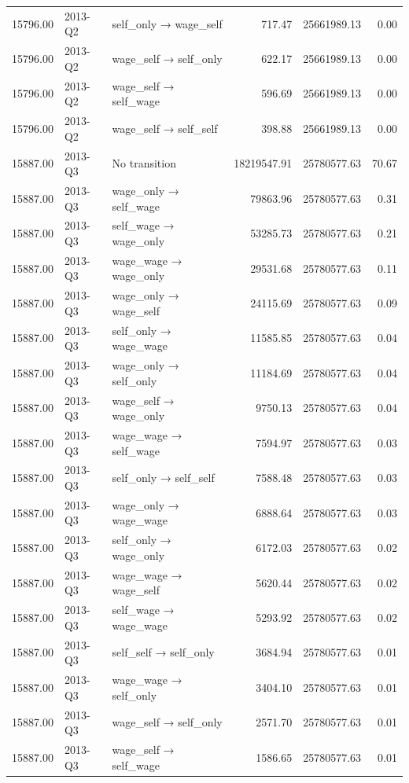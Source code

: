 \begin{table}[ht]
{\begin{tabular}{rllrrr}
  15796.00 & 2013-Q2 & self\_only → wage\_self & 717.47 & 25661989.13 & 0.00 \\ 
  15796.00 & 2013-Q2 & wage\_self → self\_only & 622.17 & 25661989.13 & 0.00 \\ 
  15796.00 & 2013-Q2 & wage\_self → self\_wage & 596.69 & 25661989.13 & 0.00 \\ 
  15796.00 & 2013-Q2 & wage\_self → self\_self & 398.88 & 25661989.13 & 0.00 \\ 
  15887.00 & 2013-Q3 & No transition & 18219547.91 & 25780577.63 & 70.67 \\ 
  15887.00 & 2013-Q3 & wage\_only → self\_wage & 79863.96 & 25780577.63 & 0.31 \\ 
  15887.00 & 2013-Q3 & self\_wage → wage\_only & 53285.73 & 25780577.63 & 0.21 \\ 
  15887.00 & 2013-Q3 & wage\_wage → wage\_only & 29531.68 & 25780577.63 & 0.11 \\ 
  15887.00 & 2013-Q3 & wage\_only → wage\_self & 24115.69 & 25780577.63 & 0.09 \\ 
  15887.00 & 2013-Q3 & self\_only → wage\_wage & 11585.85 & 25780577.63 & 0.04 \\ 
  15887.00 & 2013-Q3 & wage\_only → self\_only & 11184.69 & 25780577.63 & 0.04 \\ 
  15887.00 & 2013-Q3 & wage\_self → wage\_only & 9750.13 & 25780577.63 & 0.04 \\ 
  15887.00 & 2013-Q3 & wage\_wage → self\_wage & 7594.97 & 25780577.63 & 0.03 \\ 
  15887.00 & 2013-Q3 & self\_only → self\_self & 7588.48 & 25780577.63 & 0.03 \\ 
  15887.00 & 2013-Q3 & wage\_only → wage\_wage & 6888.64 & 25780577.63 & 0.03 \\ 
  15887.00 & 2013-Q3 & self\_only → wage\_only & 6172.03 & 25780577.63 & 0.02 \\ 
  15887.00 & 2013-Q3 & wage\_wage → wage\_self & 5620.44 & 25780577.63 & 0.02 \\ 
  15887.00 & 2013-Q3 & self\_wage → wage\_wage & 5293.92 & 25780577.63 & 0.02 \\ 
  15887.00 & 2013-Q3 & self\_self → self\_only & 3684.94 & 25780577.63 & 0.01 \\ 
  15887.00 & 2013-Q3 & wage\_wage → self\_only & 3404.10 & 25780577.63 & 0.01 \\ 
  15887.00 & 2013-Q3 & wage\_self → self\_only & 2571.70 & 25780577.63 & 0.01 \\ 
  15887.00 & 2013-Q3 & wage\_self → self\_wage & 1586.65 & 25780577.63 & 0.01 \\ 

\end{tabular}}
\end{table}
